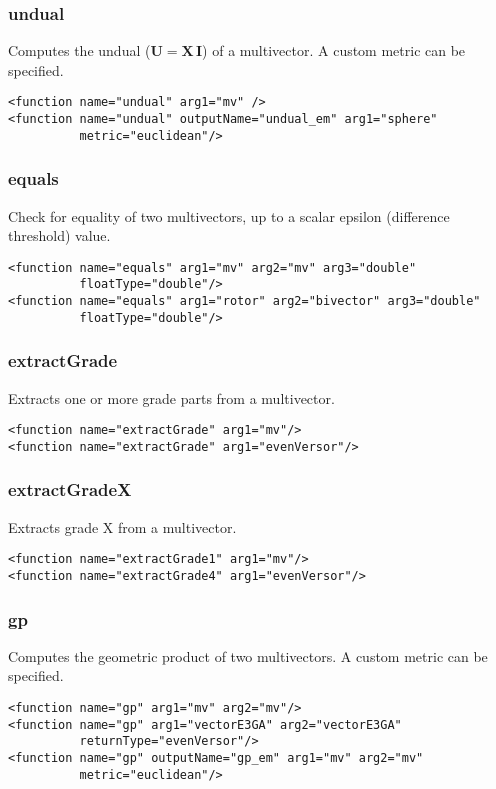 \documentclass[10pt, a4paper]{article}
\newcommand{\gav}[1]{\ensuremath{\mathbf{#1}}}
\newcommand{\gp}{\,}
\begin{document}
\subsubsection*{undual}

Computes the undual ($\gav{U} = \gav{X} \gp \gav{I}$) of a multivector. A custom metric can be specified.
\begin{verbatim}
<function name="undual" arg1="mv" />
<function name="undual" outputName="undual_em" arg1="sphere" 
          metric="euclidean"/>
\end{verbatim}

\subsubsection*{equals}

Check for equality of two multivectors, up to a scalar epsilon (difference threshold) value.
\begin{verbatim}
<function name="equals" arg1="mv" arg2="mv" arg3="double" 
          floatType="double"/>
<function name="equals" arg1="rotor" arg2="bivector" arg3="double" 
          floatType="double"/>
\end{verbatim}

\subsubsection*{extractGrade}

Extracts one or more grade parts from a multivector.
\begin{verbatim}
<function name="extractGrade" arg1="mv"/>
<function name="extractGrade" arg1="evenVersor"/>
\end{verbatim}

\subsubsection*{extractGradeX}

Extracts grade X from a multivector.
\begin{verbatim}
<function name="extractGrade1" arg1="mv"/>
<function name="extractGrade4" arg1="evenVersor"/>
\end{verbatim}

\subsubsection*{gp}

Computes the geometric product of two multivectors. A custom metric can be specified.
\begin{verbatim}
<function name="gp" arg1="mv" arg2="mv"/>
<function name="gp" arg1="vectorE3GA" arg2="vectorE3GA" 
          returnType="evenVersor"/>
<function name="gp" outputName="gp_em" arg1="mv" arg2="mv" 
          metric="euclidean"/>
\end{verbatim}
\end{document}
